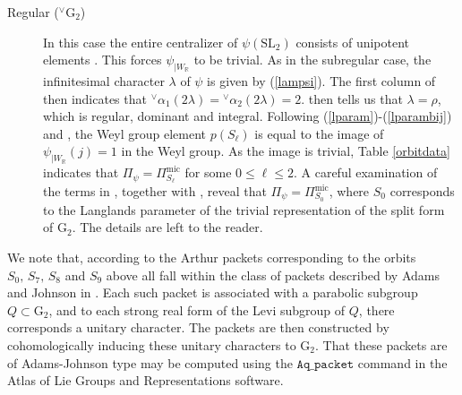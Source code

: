 \documentclass[a4paper, 11pt]{article}
\begin{document}
\begin{description}
\item[Regular (${^\vee}\mathrm{G}_{2}$)]  In this case the entire centralizer
  of $\psi(\mathrm{SL}_{2})$  consists of unipotent elements
  \cite[Tables 7.12 and 7.18]{HumphCC}.   This forces
  $\psi_{|W_{\mathbb{R}}}$ to be trivial. 
 As in the subregular case, the
  infinitesimal character $\lambda$ of $\psi$ is given by (\ref{lampsi}).  The
  first column of \cite[Table 7.12]{HumphCC} then indicates that 
${^\vee}\alpha_{1}(2\lambda) = {^\vee}\alpha_{2}(2\lambda) = 2$.  
  \cite[Lemma A 13.3]{Humphreys} then tells us that
$\lambda = \rho$, which is regular, dominant and integral.
  Following
  (\ref{lparam})-(\ref{lparambij}) and \cite[(22.8)]{ABV}, the Weyl
  group element $p(S_{\ell})$ 
  is equal to the image of $\psi_{|W_{\mathbb{R}}}(j) = 1$ in the Weyl
  group.   As the image is trivial, Table \ref{orbitdata}
  indicates that $\Pi_{\psi} = \Pi_{S_{\ell}}^{\mathrm{mic}}$ for some
  $0 \leq \ell \leq 2$.  A careful examination of the terms in
  \cite[(22.8)(c)]{ABV}, together with \cite[(5.7)(c) and Proposition
    6.17]{ABV}, reveal 
  that $\Pi_{\psi} = \Pi_{S_{0}}^{\mathrm{mic}}$, where $S_{0}$
  corresponds to the Langlands parameter of the trivial
  representation of the split form of $\mathrm{G}_{2}$.  The details
  are left to the reader. 
  
  \end{description}
We note that, according to \cite[Corollary
  4.18]{arancibia_characteristic} the Arthur packets corresponding to
the orbits 
$S_0,\, S_7,\, S_8$ and $S_9$ above all fall within the class of packets
described by Adams and Johnson in \cite[Definition
  2.11]{Adams-Johnson}. Each such packet is associated with a
parabolic subgroup $Q \subset \mathrm{G}_{2}$, and to
each strong real form 
of the Levi subgroup of $Q$, there corresponds a unitary
character. The packets are then constructed by cohomologically
inducing these unitary characters to $\mathrm{G}_{2}$. That these
packets are of Adams-Johnson type may be computed using the
$\mathtt{Aq\_packet}$ command in the Atlas of Lie Groups and
Representations software. 
\end{document}
